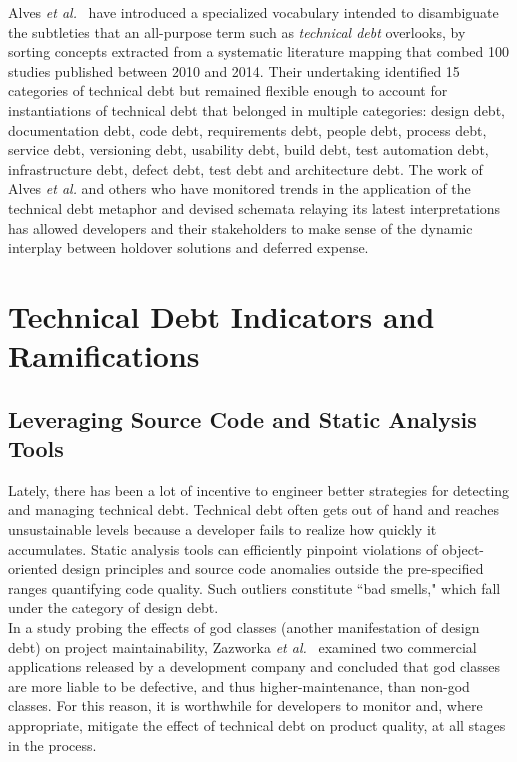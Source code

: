 Alves \textit{et al.}~\cite{alves2014towards} have introduced a specialized vocabulary intended to disambiguate the subtleties that an all-purpose term such as \textit{technical debt} overlooks, by sorting concepts extracted from a systematic literature mapping that combed 100 studies published between 2010 and 2014. Their undertaking identified 15 categories of technical debt but remained flexible enough to account for instantiations of technical debt that belonged in multiple categories: design debt, documentation debt, code debt, requirements debt, people debt, process debt, service debt, versioning debt, usability debt, build debt, test automation debt, infrastructure debt, defect debt, test debt and architecture debt. The work of Alves \textit{et al.} and others who have monitored trends in the application of the technical debt metaphor and devised schemata relaying its latest interpretations has allowed developers and their stakeholders to make sense of the dynamic interplay between holdover solutions and deferred expense.

\section{Technical Debt Indicators and Ramifications}


\subsection{Leveraging Source Code and Static Analysis Tools}

Lately, there has been a lot of incentive to engineer better strategies for detecting and managing technical debt. Technical debt often gets out of hand and reaches unsustainable levels because a developer fails to realize how quickly it accumulates. \revision Static analysis tools can efficiently pinpoint violations of object-oriented design principles and source code anomalies outside the pre-specified ranges quantifying code quality. Such outliers constitute ``bad smells," which fall under the category of design debt.\\

In a study probing the effects of god classes (another manifestation of design debt) on project maintainability, Zazworka \textit{et al.}~\cite{zazworka2011investigating} examined two commercial applications released by a development company and concluded that god classes are more liable to be defective, and thus higher-maintenance, than non-god classes. For this reason, it is worthwhile for developers to monitor and, where appropriate, mitigate the effect of technical debt on product quality, at all stages in the process.\\

